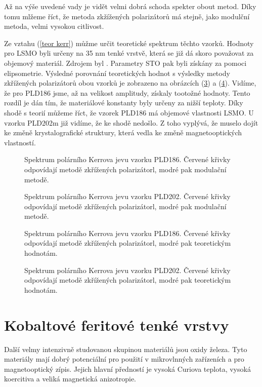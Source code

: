 Až na výše uvedené vady je vidět velmi dobrá schoda spekter obout metod. Díky tomu mlžeme říct, že metoda zkžížených polarizátorů má stejně, jako modulční metoda, velmi 
vysokou citlivost.

Ze vztahu (\ref{teor kerr}) můžme určit teoretické spektrum těchto vzorků. Hodnoty pro LSMO byli určeny na 35 nm tenké vrstvě, která 
se již dá skoro považovat za objemový materiál. Zdrojem byl \cite{PLD}. Parametry STO pak byli získány za pomoci elipsometrie. Výsledné porovnání 
teoretických hodnot s výsledky metody zkřížených polarizátorů obou 
vzorků je zobrazeno na obrázcích (\ref{sPLD186t}) a (\ref{sPLD202t}). Vidíme, že pro PLD186 jsme, až na velikost amplitudy, získaly tootožné hodnoty. 
Tento rozdíl je dán tím, že materiálové konstanty byly určeny za nižší teploty. Díky shodě s teorií můžeme říct, že vzorek PLD186 má objemové vlastnosti LSMO. 
U vzorku PLD202m již vidíme, že ke shodě nedošlo. Z toho vyplývá, že muselo dojít ke změně krystalografické struktury, která vedla ke změně magnetooptických vlastností.

\begin{figure}

\caption{Spektrum polárního Kerrova jevu vzorku PLD186. Červené křivky odpovídají metodě zkřížených polarizátorl, modré pak modulační metodě.}
\label{sPLD186}
\end{figure}

\begin{figure}

\caption{Spektrum polárního Kerrova jevu vzorku PLD202. Červené křivky odpovídají metodě zkřížených polarizátorl, modré pak modulační metodě.}
\label{sPLD202}
\end{figure}

\begin{figure}

\caption{Spektrum polárního Kerrova jevu vzorku PLD186. Červené křivky odpovídají metodě zkřížených polarizátorl, modré pak teoretickým hodnotám.}
\label{sPLD186t}
\end{figure}

\begin{figure}

\caption{Spektrum polárního Kerrova jevu vzorku PLD202. Červené křivky odpovídají metodě zkřížených polarizátorl, modré pak teoretickým hodnotám.}
\label{sPLD202t}
\end{figure}
\section{Kobaltové feritové tenké vrstvy}
Další velmy intenzivně studovanou skupinou materiálů jsou oxidy železa.
Tyto materiály mají dobrý potenciální pro použití v mikrovlnných zařízeních a  pro magnetooptický zípis. 
Jejich hlavní předností je vysoká Curiova teplota, vysoká koercitiva a veliká magnetická anizotropie. 


